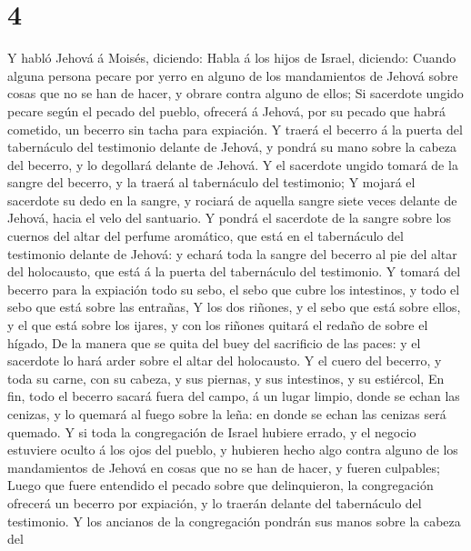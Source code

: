 \hypertarget{section-3}{%
\section{4}\label{section-3}}

 Y habló Jehová á Moisés, diciendo:  Habla á los
hijos de Israel, diciendo: Cuando alguna persona pecare por yerro en
alguno de los mandamientos de Jehová sobre cosas que no se han de hacer,
y obrare contra alguno de ellos;  Si sacerdote ungido pecare
según el pecado del pueblo, ofrecerá á Jehová, por su pecado que habrá
cometido, un becerro sin tacha para expiación.  Y traerá el
becerro á la puerta del tabernáculo del testimonio delante de Jehová, y
pondrá su mano sobre la cabeza del becerro, y lo degollará delante de
Jehová.  Y el sacerdote ungido tomará de la sangre del
becerro, y la traerá al tabernáculo del testimonio;  Y
mojará el sacerdote su dedo en la sangre, y rociará de aquella sangre
siete veces delante de Jehová, hacia el velo del santuario. 
Y pondrá el sacerdote de la sangre sobre los cuernos del altar del
perfume aromático, que está en el tabernáculo del testimonio delante de
Jehová: y echará toda la sangre del becerro al pie del altar del
holocausto, que está á la puerta del tabernáculo del testimonio.
 Y tomará del becerro para la expiación todo su sebo, el
sebo que cubre los intestinos, y todo el sebo que está sobre las
entrañas,  Y los dos riñones, y el sebo que está sobre
ellos, y el que está sobre los ijares, y con los riñones quitará el
redaño de sobre el hígado,  De la manera que se quita del
buey del sacrificio de las paces: y el sacerdote lo hará arder sobre el
altar del holocausto.  Y el cuero del becerro, y toda su
carne, con su cabeza, y sus piernas, y sus intestinos, y su estiércol,
 En fin, todo el becerro sacará fuera del campo, á un lugar
limpio, donde se echan las cenizas, y lo quemará al fuego sobre la leña:
en donde se echan las cenizas será quemado.  Y si toda la
congregación de Israel hubiere errado, y el negocio estuviere oculto á
los ojos del pueblo, y hubieren hecho algo contra alguno de los
mandamientos de Jehová en cosas que no se han de hacer, y fueren
culpables;  Luego que fuere entendido el pecado sobre que
delinquieron, la congregación ofrecerá un becerro por expiación, y lo
traerán delante del tabernáculo del testimonio.  Y los
ancianos de la congregación pondrán sus manos sobre la cabeza del
